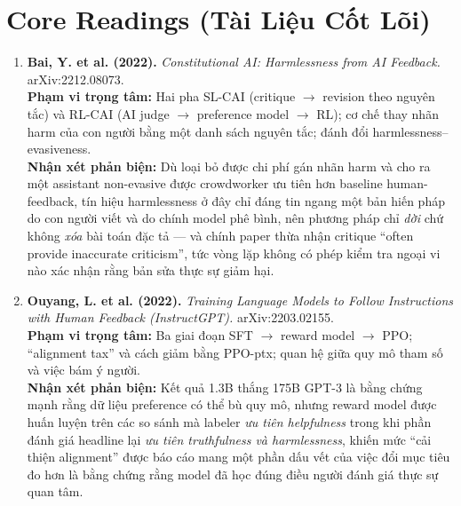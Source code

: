 \documentclass[10pt,a4paper]{article}
\begin{document}
\section{Core Readings (Tài Liệu Cốt Lõi)}
\begin{enumerate}[leftmargin=1.4em, itemsep=7pt, topsep=3pt]
  \item \textbf{Bai, Y. et al. (2022).} \textit{Constitutional AI: Harmlessness from AI Feedback.} arXiv:2212.08073.\\
  \textbf{Phạm vi trọng tâm:} Hai pha SL-CAI (critique $\to$ revision theo nguyên tắc) và RL-CAI (AI judge $\to$ preference model $\to$ RL); cơ chế thay nhãn harm của con người bằng một danh sách nguyên tắc; đánh đổi harmlessness--evasiveness.\\
  \textcolor{critiquecolor}{\textbf{Nhận xét phản biện:}} Dù loại bỏ được chi phí gán nhãn harm và cho ra một assistant non-evasive được crowdworker ưu tiên hơn baseline human-feedback, tín hiệu harmlessness ở đây chỉ đáng tin ngang một bản hiến pháp do con người viết và do chính model phê bình, nên phương pháp chỉ \emph{dời} chứ không \emph{xóa} bài toán đặc tả --- và chính paper thừa nhận critique ``often provide inaccurate criticism'', tức vòng lặp không có phép kiểm tra ngoại vi nào xác nhận rằng bản sửa thực sự giảm hại.

  \item \textbf{Ouyang, L. et al. (2022).} \textit{Training Language Models to Follow Instructions with Human Feedback (InstructGPT).} arXiv:2203.02155.\\
  \textbf{Phạm vi trọng tâm:} Ba giai đoạn SFT $\to$ reward model $\to$ PPO; ``alignment tax'' và cách giảm bằng PPO-ptx; quan hệ giữa quy mô tham số và việc bám ý người.\\
  \textcolor{critiquecolor}{\textbf{Nhận xét phản biện:}} Kết quả 1.3B thắng 175B GPT-3 là bằng chứng mạnh rằng dữ liệu preference có thể bù quy mô, nhưng reward model được huấn luyện trên các so sánh mà labeler \emph{ưu tiên helpfulness} trong khi phần đánh giá headline lại \emph{ưu tiên truthfulness và harmlessness}, khiến mức ``cải thiện alignment'' được báo cáo mang một phần dấu vết của việc đổi mục tiêu đo hơn là bằng chứng rằng model đã học đúng điều người đánh giá thực sự quan tâm.
\end{enumerate}
\end{document}
